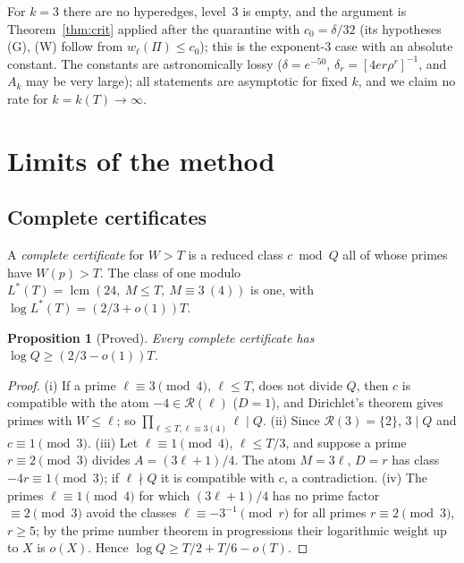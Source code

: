 \documentclass[11pt,reqno]{amsart}
\newtheorem{proposition}[theorem]{Proposition}
\theoremstyle{definition}
\newcommand{\lcm}{\operatorname{lcm}}
\newcommand{\cR}{\mathcal R}
\begin{document}
For $k=3$ there are no hyperedges, level~$3$ is empty, and the argument is
Theorem~\ref{thm:crit} applied after the quarantine with $c_0=\delta/32$ (its
hypotheses (G), (W) follow from $w_\ell(\Pi)\le c_0$); this is the exponent-$3$
case with an absolute constant.  The constants are astronomically lossy
($\delta=e^{-50}$, $\delta_r=[4er\rho^r]^{-1}$, and $A_k$ may be very large);
all statements are asymptotic for fixed $k$, and we claim no rate for $k=k(T)\to\infty$.

\section{Limits of the method}\label{sec:limits}

\subsection{Complete certificates}

A \emph{complete certificate} for $W>T$ is a reduced class $c\bmod Q$ all of
whose primes have $W(p)>T$.  The class of one modulo
$L^*(T)=\lcm(24,\ M\le T,\ M\equiv3\ (4))$ is one, with
$\log L^*(T)=(2/3+o(1))T$.

\begin{proposition}[Proved]\label{prop:complete}
Every complete certificate has $\log Q\ge(2/3-o(1))T$.
\end{proposition}

\begin{proof}
(i) If a prime $\ell\equiv3\pmod4$, $\ell\le T$, does not divide $Q$, then $c$
is compatible with the atom $-4\in\cR(\ell)$ ($D=1$), and Dirichlet's theorem
gives primes with $W\le\ell$; so $\prod_{\ell\le T,\ell\equiv3(4)}\ell\mid Q$.
(ii) Since $\cR(3)=\{2\}$, $3\mid Q$ and $c\equiv1\pmod3$.  (iii) Let
$\ell\equiv1\pmod4$, $\ell\le T/3$, and suppose a prime $r\equiv2\pmod3$ divides
$A=(3\ell+1)/4$.  The atom $M=3\ell$, $D=r$ has class $-4r\equiv1\pmod3$; if
$\ell\nmid Q$ it is compatible with $c$, a contradiction.  (iv) The primes
$\ell\equiv1\pmod4$ for which $(3\ell+1)/4$ has no prime factor $\equiv2\pmod3$
avoid the classes $\ell\equiv-3^{-1}\pmod r$ for all primes $r\equiv2\pmod 3$,
$r\ge5$; by the prime number theorem in progressions their logarithmic
weight up to $X$ is $o(X)$.  Hence $\log Q\ge T/2+T/6-o(T)$.
\end{proof}
\end{document}
